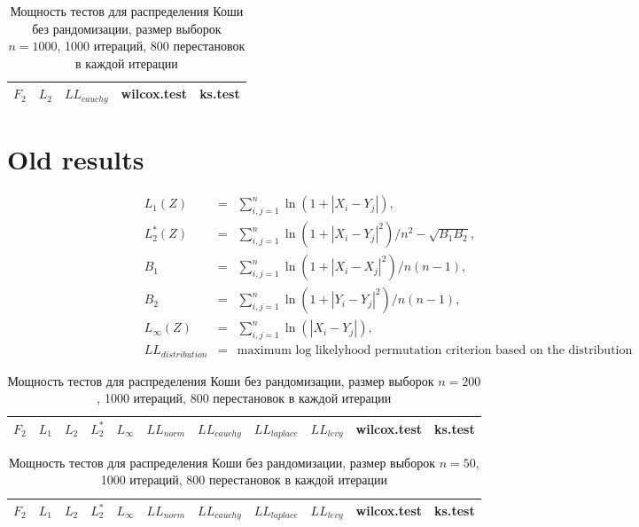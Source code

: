 \documentclass{report}
\begin{document}
\begin{longtable}{|c|c|c|c|c|}
  \caption{Мощность тестов для распределения Коши без рандомизации, размер выборок $n=1000$, 1000 итераций, 800 перестановок в каждой итерации} \\
  \hline
  $F_2$ & $L_{2}$ & $LL_{cauchy}$ & wilcox.test & ks.test \\ \hline
  
  \hline
\end{longtable}

\chapter*{Old results}

\begin{eqnarray}
  L_1(Z)&=&\sum_{i,j=1}^{n}{\ln(1+|X_{i}-Y_{j}|)},\\
  L_2^*(Z)&=&\sum_{i,j=1}^{n}{\ln(1+|X_{i}-Y_{j}|^2)}/n^2-\sqrt{B_1 B_2},\\
  B_1 &=& \sum_{i,j=1}^{n}{\ln(1+|X_{i}-X_{j}|^2)}/n(n-1),\\
  B_2 &=& \sum_{i,j=1}^{n}{\ln(1+|Y_{i}-Y_{j}|^2)}/n(n-1),\\
  L_\infty(Z)&=&\sum_{i,j=1}^{n}{\ln(|X_{i}-Y_{j}|)},\\
  LL_{distribution} &=& \text{maximum log likelyhood permutation criterion based on the distribution}
\end{eqnarray}

\begin{longtable}{|c|c|c|c|c|c|c|c|c|c|c|}
  \caption{Мощность тестов для распределения Коши без рандомизации, размер выборок $n=200$, 1000 итераций, 800 перестановок в каждой итерации} \\
  \hline
  $F_2$ & $L_{1}$ & $L_{2}$ & $L_2^*$ & $L_{\infty}$ & $LL_{norm}$ & $LL_{cauchy}$ & $LL_{laplace}$ & $LL_{levy}$ & wilcox.test & ks.test \\ \hline
  
\end{longtable}

\newpage

\begin{longtable}{|c|c|c|c|c|c|c|c|c|c|c|}
  \caption{Мощность тестов для распределения Коши без рандомизации, размер выборок $n=50$, 1000 итераций, 800 перестановок в каждой итерации} \\
  \hline
  $F_2$ & $L_{1}$ & $L_{2}$ & $L_2^*$ & $L_{\infty}$ & $LL_{norm}$ & $LL_{cauchy}$ & $LL_{laplace}$ & $LL_{levy}$ & wilcox.test & ks.test \\ \hline
  
\end{longtable}
\end{document}
